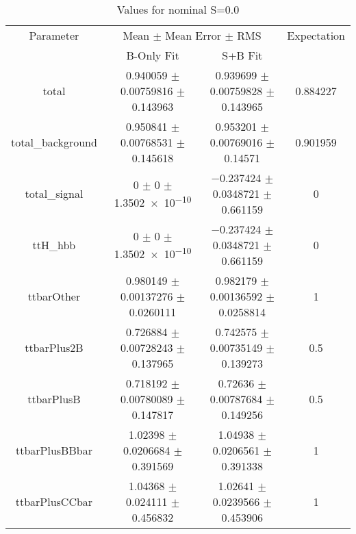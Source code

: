 \begin{table}
\centering
\caption{Values for nominal S=0.0}
\begin{tabular}{cccc}
\toprule
Parameter & \multicolumn{2}{c}{Mean $\pm$ Mean Error $\pm$ RMS} & Expectation\\
 & B-Only Fit & S+B Fit & \\
\midrule
total & \num{0.940059} $\pm$ \num{0.00759816} $\pm$ \num{0.143963} & \num{0.939699} $\pm$ \num{0.00759828} $\pm$ \num{0.143965} & \num{0.884227}\\
total\_background & \num{0.950841} $\pm$ \num{0.00768531} $\pm$ \num{0.145618} & \num{0.953201} $\pm$ \num{0.00769016} $\pm$ \num{0.14571} & \num{0.901959}\\
total\_signal & \num{0} $\pm$ \num{0} $\pm$ \num{1.3502e-10} & \num{-0.237424} $\pm$ \num{0.0348721} $\pm$ \num{0.661159} & \num{0}\\
ttH\_hbb & \num{0} $\pm$ \num{0} $\pm$ \num{1.3502e-10} & \num{-0.237424} $\pm$ \num{0.0348721} $\pm$ \num{0.661159} & \num{0}\\
ttbarOther & \num{0.980149} $\pm$ \num{0.00137276} $\pm$ \num{0.0260111} & \num{0.982179} $\pm$ \num{0.00136592} $\pm$ \num{0.0258814} & \num{1}\\
ttbarPlus2B & \num{0.726884} $\pm$ \num{0.00728243} $\pm$ \num{0.137965} & \num{0.742575} $\pm$ \num{0.00735149} $\pm$ \num{0.139273} & \num{0.5}\\
ttbarPlusB & \num{0.718192} $\pm$ \num{0.00780089} $\pm$ \num{0.147817} & \num{0.72636} $\pm$ \num{0.00787684} $\pm$ \num{0.149256} & \num{0.5}\\
ttbarPlusBBbar & \num{1.02398} $\pm$ \num{0.0206684} $\pm$ \num{0.391569} & \num{1.04938} $\pm$ \num{0.0206561} $\pm$ \num{0.391338} & \num{1}\\
ttbarPlusCCbar & \num{1.04368} $\pm$ \num{0.024111} $\pm$ \num{0.456832} & \num{1.02641} $\pm$ \num{0.0239566} $\pm$ \num{0.453906} & \num{1}\\
\bottomrule
\end{tabular}
\end{table}